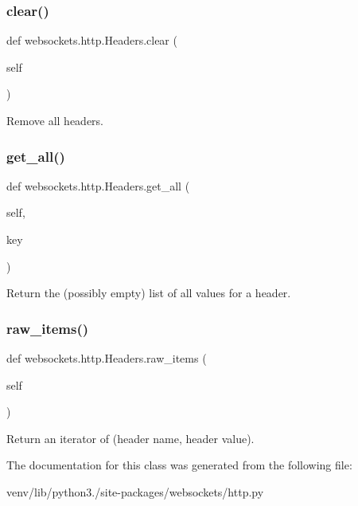 \subsubsection{\texorpdfstring{clear()}{clear()}}
{\footnotesize\ttfamily def websockets.\+http.\+Headers.\+clear (\begin{DoxyParamCaption}\item[{}]{self }\end{DoxyParamCaption})}

\begin{DoxyVerb}Remove all headers.\end{DoxyVerb}
 \mbox{\label{classwebsockets_1_1http_1_1_headers_ad990f8341a755d293a4b5661d15ec501}} 
\subsubsection{\texorpdfstring{get\+\_\+all()}{get\_all()}}
{\footnotesize\ttfamily def websockets.\+http.\+Headers.\+get\+\_\+all (\begin{DoxyParamCaption}\item[{}]{self,  }\item[{}]{key }\end{DoxyParamCaption})}

\begin{DoxyVerb}Return the (possibly empty) list of all values for a header.\end{DoxyVerb}
 \mbox{\label{classwebsockets_1_1http_1_1_headers_a0fbb3ba41822be545f0302c3190d3cc6}} 
\subsubsection{\texorpdfstring{raw\+\_\+items()}{raw\_items()}}
{\footnotesize\ttfamily def websockets.\+http.\+Headers.\+raw\+\_\+items (\begin{DoxyParamCaption}\item[{}]{self }\end{DoxyParamCaption})}

\begin{DoxyVerb}Return an iterator of (header name, header value).\end{DoxyVerb}
 

The documentation for this class was generated from the following file\+:\begin{DoxyCompactItemize}
\item 
venv/lib/python3./site-\/packages/websockets/http.\+py\end{DoxyCompactItemize}
